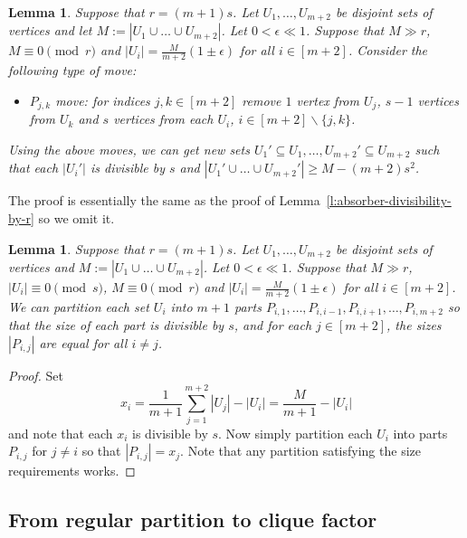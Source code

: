 \documentclass[reqno, 12pt]{amsart}
\numberwithin{equation}{section}
\numberwithin{figure}{section}
\theoremstyle{plain}
\newtheorem{lemma}[thm]{Lemma}
\theoremstyle{definition}
\let\setminus=\smallsetminus
\begin{document}
    \begin{lemma}
    \label{l:sing-absorber-divisibility-by-s}
        Suppose that $r=(m+1)s$. Let $U_1,\dots, U_{m+2}$ be disjoint sets of vertices and let $M:=|U_1\cup\dots\cup U_{m+2}|$. Let $0<\epsilon \ll 1$. Suppose that $M\gg r$, $M \equiv 0 \pmod{r}$ and $|U_i|= \frac{M}{m+2}(1\pm \epsilon)$ for all $i\in [m+2]$. Consider the following type of move:
        \begin{itemize}
            \item $P_{j,k}$ move: for indices $j,k\in [m+2]$ remove $1$ vertex from $U_j$, $s-1$ vertices from $U_k$ and $s$ vertices from each $U_i$, $i\in[m+2]\setminus\{j,k\}$.
        \end{itemize}
        Using the above moves, we can get new sets $U_1'\subseteq U_1,\dots , U_{m+2}'\subseteq U_{m+2}$ such that each $|U_i'|$ is divisible by $s$ and $|U_1'\cup \dots \cup U_{m+2}'|\geq M-(m+2)s^2$.
    \end{lemma}

        The proof is essentially the same as the proof of Lemma~\ref{l:absorber-divisibility-by-r} so we omit it.

    \begin{lemma}\label{l:sing-absorber-partitioning}
        Suppose that $r=(m+1)s$. Let $U_1,\dots, U_{m+2}$ be disjoint sets of vertices and $M:=|U_1\cup\dots\cup U_{m+2}|$. Let $0<\epsilon \ll 1$. Suppose that $M\gg r$, $|U_i|\equiv 0 \pmod{s}$, $M\equiv 0 \pmod{r}$ and $|U_i|= \frac{M}{m+2}(1\pm \epsilon)$ for all $i\in [m+2]$. We can partition each set $U_i$ into $m+1$ parts $P_{i,1},\dots, P_{i,i-1}, P_{i,i+1},\dots, P_{i,m+2}$ so that the size of each part is divisible by $s$, and for each $j\in [m+2]$, the sizes $|P_{i,j}|$ are equal for all $i\neq j$.
    \end{lemma}

    \begin{proof}
          Set 
          \[x_i=\frac{1}{m+1}\sum_{j=1}^{m+2}|U_j|-|U_i| = \frac{M}{m+1}-|U_i|\] 
          and note that each $x_i$ is divisible by $s$. Now simply partition each $U_i$ into parts $P_{i,j}$ for $j\neq i$ so that $|P_{i,j}|=x_j$. Note that any partition satisfying the size requirements works.
    \end{proof}

    \subsection{From regular partition to clique factor}
        \label{sec:balancing}
        
\end{document}
